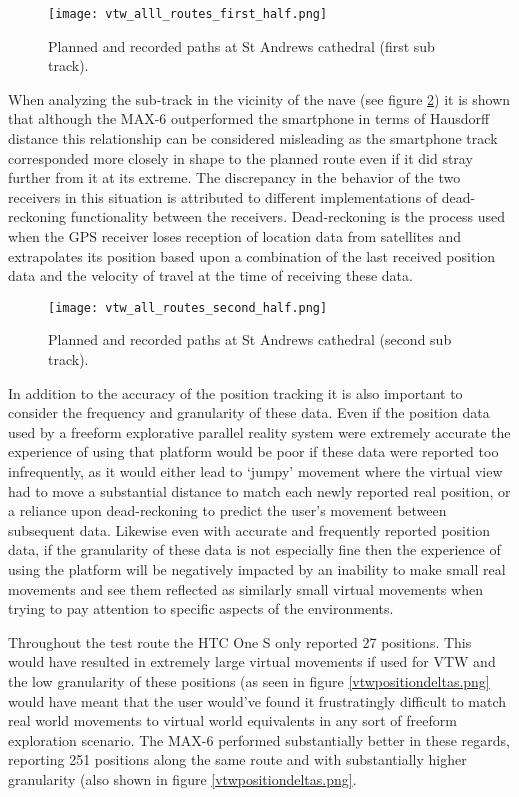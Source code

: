 \begin{figure}[h]
\centering
\texttt{[image: vtw\_alll\_routes\_first\_half.png]}
\caption{Planned and recorded paths at St Andrews cathedral (first sub track).}
\label{vtw_alll_routes_first_half.png}
\end{figure}

When analyzing the sub-track in the vicinity of the nave (see figure \ref{vtw_all_routes_second_half.png}) it is shown that although the MAX-6 outperformed the smartphone in terms of Hausdorff distance this relationship can be considered misleading as the smartphone track corresponded more closely in shape to the planned route even if it did stray further from it at its extreme. The discrepancy in the behavior of the two receivers in this situation is attributed to different implementations of dead-reckoning functionality between the receivers. Dead-reckoning is the process used when the GPS receiver loses reception of location data from satellites and extrapolates its position based upon a combination of the last received position data and the velocity of travel at the time of receiving these data.
 
\begin{figure}[h]
\centering
\texttt{[image: vtw\_all\_routes\_second\_half.png]}
\caption{Planned and recorded paths at St Andrews cathedral (second sub track).}
\label{vtw_all_routes_second_half.png}
\end{figure}

In addition to the accuracy of the position tracking it is also important to consider the frequency and granularity of these data. Even if the position data used by a freeform explorative parallel reality system were extremely accurate the experience of using that platform would be poor if these data were reported too infrequently, as it would either lead to `jumpy' movement where the virtual view had to move a substantial distance to match each newly reported real position, or a reliance upon dead-reckoning to predict the user's movement between subsequent data. Likewise even with accurate and frequently reported position data, if the granularity of these data is not especially fine then the experience of using the platform will be negatively impacted by an inability to make small real movements and see them reflected as similarly small virtual movements when trying to pay attention to specific aspects of the environments.

Throughout the test route the HTC One S only reported 27 positions. This would have resulted in extremely large virtual movements if used for VTW and the low granularity of these positions (as seen in figure \ref{vtwpositiondeltas.png} would have meant that the user would've found it frustratingly difficult to match real world movements to virtual world equivalents in any sort of freeform exploration scenario. The MAX-6 performed substantially better in these regards, reporting 251 positions along the same route and with substantially higher granularity (also shown in figure \ref{vtwpositiondeltas.png}.


